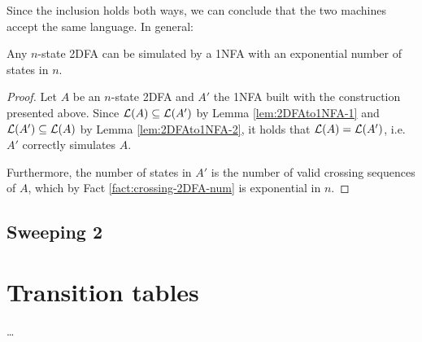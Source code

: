 Since the inclusion holds both ways, we can conclude that the two machines accept the same language.
In general:
\begin{thrm}\label{thm:2DFAto1NFA}
	Any $n$-state 2DFA can be simulated by a 1NFA with an exponential number of states in $n$.
\end{thrm}
\begin{proof}
	Let $A$ be an $n$-state 2DFA and $A'$ the 1NFA built with the construction presented above.
	Since $\mathcal L(A)\subseteq\mathcal L(A')$ by Lemma \ref{lem:2DFAto1NFA-1} and $\mathcal L(A')\subseteq\mathcal L(A)$ by Lemma \ref{lem:2DFAto1NFA-2}, it holds that $\mathcal L(A)=\mathcal L(A')$, i.e. $A'$ correctly simulates $A$.

	Furthermore, the number of states in $A'$ is the number of valid crossing sequences of $A$, which by Fact \ref{fact:crossing-2DFA-num} is exponential in $n$.
\end{proof}



\subsection{Sweeping 2\DFAs{}}



\section{Transition tables}
\dots
